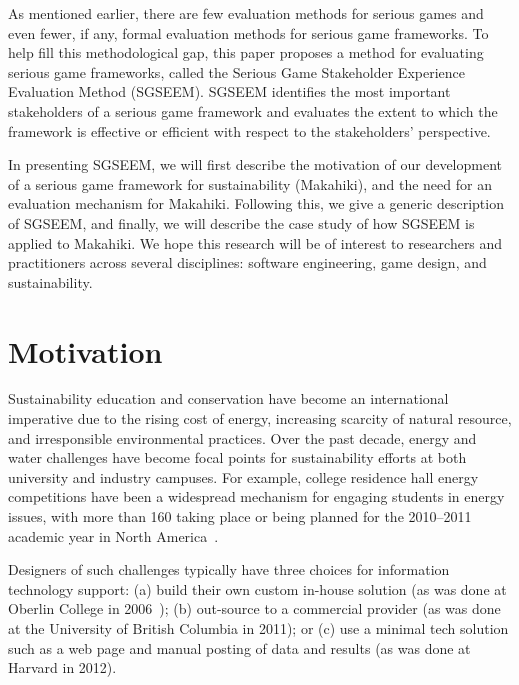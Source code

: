 \documentclass{sigchi}
\begin{document}

As mentioned earlier, there are few evaluation methods for serious games
and even fewer, if any, formal evaluation methods for serious game
frameworks. To help fill this methodological gap, this paper proposes a
method for evaluating serious game frameworks, called the Serious Game
Stakeholder Experience Evaluation Method (SGSEEM). SGSEEM identifies the
most important stakeholders of a serious game framework and evaluates
the extent to which the framework is effective or efficient with respect
to the stakeholders' perspective.

In presenting SGSEEM, we will first describe the motivation of our
development of a serious game framework for sustainability (Makahiki),
and the need for an evaluation mechanism for Makahiki. Following this,
we give a generic description of SGSEEM, and finally, we will describe
the case study of how SGSEEM is applied to Makahiki. We hope this
research will be of interest to researchers and practitioners across
several disciplines: software engineering, game design, and
sustainability.

\section{Motivation}

Sustainability education and conservation have become an international
imperative due to the rising cost of energy, increasing scarcity of
natural resource, and irresponsible environmental practices. Over the
past decade, energy and water challenges have become focal
points for sustainability efforts at both university and industry
campuses. For example, college residence hall energy competitions have
been a widespread mechanism for engaging students in energy issues,
with more than 160 taking place or being planned for the 2010--2011
academic year in North America~\cite{Hodge2010}.

Designers of such challenges typically have three choices for
information technology support: (a) build their own custom in-house
solution (as was done at Oberlin College in
2006~\cite{petersen-dorm-energy-reduction}); (b) out-source to a
commercial provider (as was done at the University of British Columbia
in 2011); or (c) use a minimal tech solution such as a web page and
manual posting of data and results (as was done at Harvard in 2012).
\end{document}
